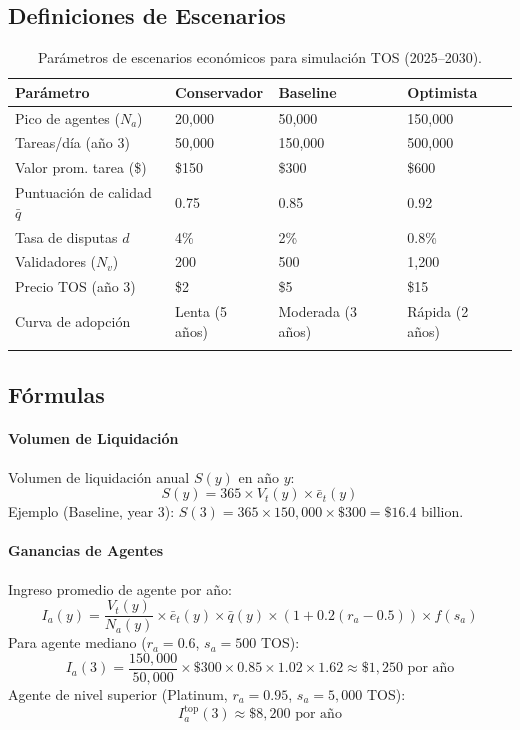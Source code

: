 \documentclass[11pt]{article}
\begin{document}
\subsection{Definiciones de Escenarios}
\begin{longtable}{@{}p{}p{}p{}p{}@{}}
\toprule
\textbf{Parámetro} & \textbf{Conservador} & \textbf{Baseline} & \textbf{Optimista} \\\midrule
Pico de agentes ($N_a$) & 20,000 & 50,000 & 150,000 \\
Tareas/día (año 3) & 50,000 & 150,000 & 500,000 \\
Valor prom. tarea (\$) & \$150 & \$300 & \$600 \\
Puntuación de calidad $\bar{q}$ & 0.75 & 0.85 & 0.92 \\
Tasa de disputas $d$ & 4\% & 2\% & 0.8\% \\
Validadores ($N_v$) & 200 & 500 & 1,200 \\
Precio TOS (año 3) & \$2 & \$5 & \$15 \\
Curva de adopción & Lenta (5 años) & Moderada (3 años) & Rápida (2 años) \\\bottomrule
\caption{Parámetros de escenarios económicos para simulación TOS (2025--2030).}
\label{tab:econ-scenarios}
\end{longtable}

\subsection{Fórmulas}
\paragraph{Volumen de Liquidación} Volumen de liquidación anual $S(y)$ en año $y$:
\begin{equation}
S(y) = 365 \times V_t(y) \times \bar{e}_t(y)
\end{equation}
Ejemplo (Baseline, year 3): $S(3) = 365 \times 150{,}000 \times \$300 = \$16.4$ billion.

\paragraph{Ganancias de Agentes} Ingreso promedio de agente por año:
\begin{equation}
I_a(y) = \frac{V_t(y)}{N_a(y)} \times \bar{e}_t(y) \times \bar{q}(y) \times (1 + 0.2(r_a - 0.5)) \times f(s_a)
\end{equation}
Para agente mediano ($r_a = 0.6$, $s_a = 500$ TOS):
\begin{equation}
I_a(3) = \frac{150{,}000}{50{,}000} \times \$300 \times 0.85 \times 1.02 \times 1.62 \approx \$1{,}250 \text{ por año}
\end{equation}
Agente de nivel superior (Platinum, $r_a = 0.95$, $s_a = 5{,}000$ TOS):
\begin{equation}
I_a^{\text{top}}(3) \approx \$8{,}200 \text{ por año}
\end{equation}
\end{document}
